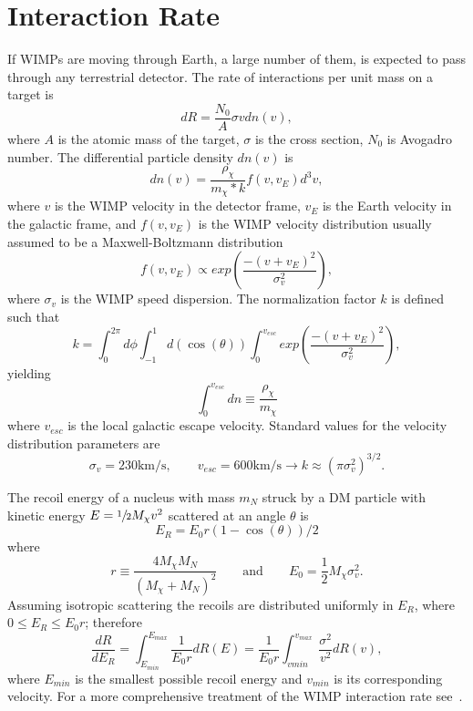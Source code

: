 \section{Interaction Rate}
If WIMPs are moving through Earth, a large number of them, is expected to pass through any terrestrial detector. The rate of interactions per unit mass on a target is
\begin{equation}
dR = \frac{N_0}{A}\sigma v dn(v),
\end{equation} 
where $A$ is the atomic mass of the target, $\sigma$ is the cross section, $N_0$ is Avogadro number. The differential particle density $dn(v)$ is
\begin{equation}
dn(v) = \frac{\rho_{\chi}}{m_{\chi}*k} f(v,v_E)d^3 v,
\end{equation}
where $v$ is the WIMP velocity in the detector frame, $v_E$ is the Earth velocity in the galactic frame, and $f(v,v_E)$ is the WIMP velocity distribution usually assumed to be a Maxwell-Boltzmann distribution
\begin{equation}
f(v,v_E) \propto exp\left(\frac{-(v+v_E)^2}{\sigma_v ^2}\right),
\end{equation} 
where $\sigma_v$ is the WIMP speed dispersion. The normalization factor $k$ is defined such that
\begin{equation}
k = \int_0^{2\pi}d\phi \int_{-1}^1d(\cos(\theta)) \int_0^{v_{esc}} exp\left(\frac{-(v+v_E)^2}{\sigma_v ^2}\right),
\end{equation}
yielding
\begin{equation}
\int_0^{v_{esc}} dn \equiv \frac{\rho_\chi}{m_\chi} 
\end{equation}
where $v_{esc}$ is the  local galactic escape velocity. Standard values for the velocity distribution parameters are
\begin{equation}
\sigma_v = 230\mathrm{km/s}, \qquad v_{esc} = 600\mathrm{km/s} \rightarrow k \approx (\pi \sigma_v^2)^{3/2}.
\end{equation} 

The recoil energy of a nucleus with mass $m_N$ struck by a DM particle with kinetic energy $E = \sfrac{1}{2}M_\chi v^2$ scattered at an angle $\theta$ is
\begin{equation}
E_R = E_0r(1-\cos(\theta))/2
\end{equation}
where
\begin{equation*}
r \equiv \frac{4M_\chi M_N}{(M_\chi + M_N)^2} \qquad \mathrm{and} \qquad E_0=\frac{1}{2}M_\chi\sigma_v^2.
\end{equation*} 
Assuming isotropic scattering the recoils are distributed uniformly in $E_R$, where $0 \leq E_R \leq E_0 r$; therefore
\begin{equation}
\frac{dR}{dE_R} = \int_{E_{min}}^{E_{max}} \frac{1}{E_0 r}dR(E) = \frac{1}{E_0r}\int_{v{min}}^{v_{max}}\frac{\sigma^2}{v^2}dR(v),
\end{equation} 
where $E_{min}$ is the smallest possible recoil energy and $v_{min}$ is its corresponding velocity. For a more comprehensive treatment of the WIMP interaction rate see~\cite{LEWIN}.




